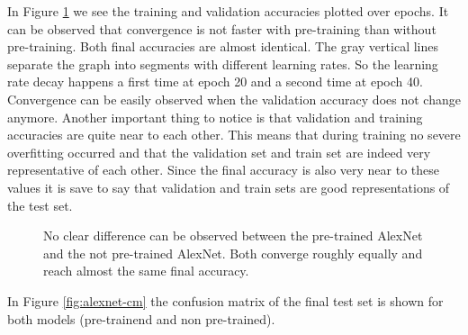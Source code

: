 In Figure \ref{fig:alexnet-graph} we see the training and validation accuracies plotted over epochs. It can be observed that convergence is not faster with pre-training than without pre-training. Both final accuracies are almost identical. The gray vertical lines separate the graph into segments with different learning rates. So the learning rate decay happens a first time at epoch 20 and a second time at epoch 40. Convergence can be easily observed when the validation accuracy does not change anymore. Another important thing to notice is that validation and training accuracies are quite near to each other. This means that during training no severe overfitting occurred and that the validation set and train set are indeed very representative of each other. Since the final accuracy is also very near to these values it is save to say that validation and train sets are good representations of the test set. \\


\begin{figure}[!h]
\centering
\caption{No clear difference can be observed between the pre-trained AlexNet and the not pre-trained AlexNet. Both converge roughly equally and reach almost the same final accuracy.}
\label{fig:alexnet-graph}
\end{figure}

In Figure \ref{fig:alexnet-cm} the confusion matrix of the final test set is shown for both models (pre-trainend and non pre-trained). \\


